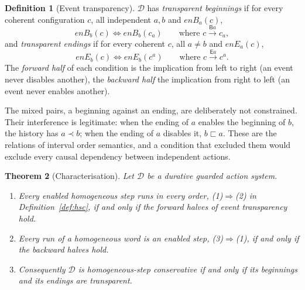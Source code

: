\documentclass[preprint,12pt]{elsarticle}
\theoremstyle{plain}
\newtheorem{theorem}{Theorem}[section]
\theoremstyle{definition}
\newtheorem{definition}[theorem]{Definition}
\newcommand{\B}[1]{\mathsf{B}#1}
\newcommand{\E}[1]{\mathsf{E}#1}
\newcommand{\istep}[1]{\xrightarrow{#1}}
\newcommand{\D}{\mathcal{D}}
\newcommand{\enB}[2]{\mathit{enB}_{#1}(#2)}
\newcommand{\enE}[2]{\mathit{enE}_{#1}(#2)}
\newcommand{\wprec}{\sqsubset}
\begin{document}
\begin{definition}[Event transparency]
\label{def:et}
$\D$ has \emph{transparent beginnings} if for every coherent configuration $c$, all independent $a, b$ and $\enB{a}{c}$,
\[
\enB{b}{c} \iff \enB{b}{c_a} \qquad\text{where } c \istep{\B{a}} c_a ,
\]
and \emph{transparent endings} if for every coherent $c$, all $a \neq b$ and $\enE{a}{c}$,
\[
\enE{b}{c} \iff \enE{b}{c^a} \qquad\text{where } c \istep{\E{a}} c^a .
\]
The \emph{forward half} of each condition is the implication from left to right (an event never disables another), the \emph{backward half} the implication from right to left (an event never enables another).
\end{definition}

The mixed pairs, a beginning against an ending, are deliberately not constrained. Their interference is legitimate: when the ending of $a$ enables the beginning of $b$, the history has $a \prec b$; when the ending of $a$ disables it, $b \wprec a$. These are the relations of interval order semantics, and a condition that excluded them would exclude every causal dependency between independent actions.

\begin{theorem}[Characterisation]
\label{thm:B-char}
Let $\D$ be a durative guarded action system.
\begin{enumerate}
\item[(i)] Every enabled homogeneous step runs in every order, (1)$\Rightarrow$(2) in Definition~\ref{def:hsc}, if and only if the forward halves of event transparency hold.
\item[(ii)] Every run of a homogeneous word is an enabled step, (3)$\Rightarrow$(1), if and only if the backward halves hold.
\item[(iii)] Consequently $\D$ is homogeneous-step conservative if and only if its beginnings and its endings are transparent.
\end{enumerate}
\end{theorem}
\end{document}
